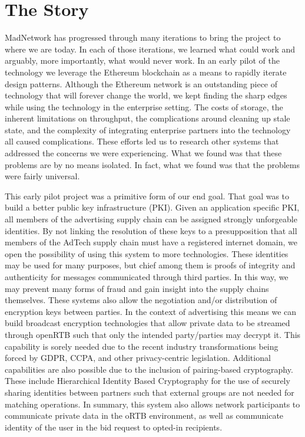 \section{The Story}

MadNetwork has progressed through many iterations to bring the project
to where we are today.
In each of those iterations, we learned what could work and arguably,
more importantly, what would never work.
In an early pilot of the technology we leverage the Ethereum blockchain
as a means to rapidly iterate design patterns.
Although the Ethereum network is an outstanding piece of technology
that will forever change the world, we kept finding the sharp edges
while using the technology in the enterprise setting.
The costs of storage, the inherent limitations on throughput, the
complications around cleaning up stale state, and the complexity of
integrating enterprise partners into the technology all caused
complications.
These efforts led us to research other systems that addressed the
concerns we were experiencing.
What we found was that these problems are by no means isolated.
In fact, what we found was that the problems were fairly universal.

This early pilot project was a primitive form of our end goal.
That goal was to build a better public key infrastructure (PKI).
Given an application specific PKI, all members of the advertising
supply chain can be assigned strongly unforgeable identities.
By not linking the resolution of these keys to a presupposition that
all members of the AdTech supply chain must have a registered internet
domain, we open the possibility of using this system to more
technologies.
These identities may be used for many purposes, but chief among them is
proofs of integrity and authenticity for messages communicated through
third parties.
In this way, we may prevent many forms of fraud and gain insight into
the supply chains themselves.
These systems also allow the negotiation and/or distribution of
encryption keys between parties.
In the context of advertising this means we can build broadcast
encryption technologies that allow private data to be streamed through
openRTB such that only the intended party/parties may decrypt it.
This capability is sorely needed due to the recent industry
transformations being forced by GDPR, CCPA, and other privacy-centric
legislation.
Additional capabilities are also possible due to the inclusion of
pairing-based cryptography.
These include Hierarchical Identity Based Cryptography for the use of
securely sharing identities between partners such that external groups
are not needed for matching operations.
In summary, this system also allows network participants to communicate
private data in the oRTB environment, as well as communicate identity
of the user in the bid request to opted-in recipients.

